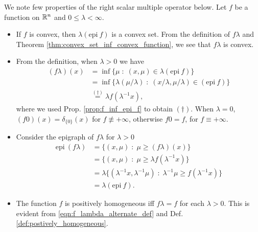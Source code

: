 \documentclass[11pt,a4paper]{article}
\begin{document}
\begin{remark}
    We note few properties of the right scalar multiple operator below. Let $f$ be a function on $\mathbb{R}^n$ and $0\le\lambda<\infty$.
    \begin{itemize}
        \item If $f$ is convex, then $\lambda(\text{epi}\ f)$ is a convex set. From the definition of $f\lambda$ and Theorem \ref{thm:convex_set_inf_convex_function}, we see that $f\lambda$ is convex. 
        \item From the definition, when $\lambda>0$ we have
        \begin{align}
            (f\lambda)(x) &= \inf\{\mu\;:\;(x,\mu)\in \lambda (\text{epi}\ f)\} \nonumber\\
            &= \inf\{\lambda (\mu/\lambda)\;:\;(x/\lambda,\mu/\lambda)\in (\text{epi}\ f)\}\nonumber\\
            &\overset{(\dagger)}{=} \lambda f(\lambda^{-1}x),\label{eqn:f_lambda_alternate_def}
        \end{align}
        where we used Prop. \ref{prop:f_inf_epi_f} to obtain $(\dagger)$. When $\lambda = 0$, $(f0)(x) = \delta_{\{0\}}(x)$ for $f\not\equiv +\infty$, otherwise $f0 = f$, for $f\equiv +\infty$.
        \item Consider the epigraph of $f\lambda$ for $\lambda>0$
        \begin{align}
            \text{epi}\ (f\lambda) &= \{(x,\mu)\;:\; \mu\ge (f\lambda)(x)\}\nonumber \\
            &= \{(x,\mu)\;:\; \mu\ge \lambda f(\lambda^{-1} x)\}\nonumber \\
            &= \lambda\{(\lambda^{-1} x,\lambda^{-1} \mu)\;:\; \lambda^{-1}\mu\ge f(\lambda^{-1} x)\}\nonumber \\
            &= \lambda (\text{epi}\ f).\label{eqn:epi_f_lambda}
        \end{align}
        \item The function $f$ is positively homogeneous iff $f\lambda = f$ for each $\lambda>0$. This is evident from \eqref{eqn:f_lambda_alternate_def} and Def. \ref{def:postively_homogeneous}.
    \end{itemize}
\end{remark}
\end{document}
